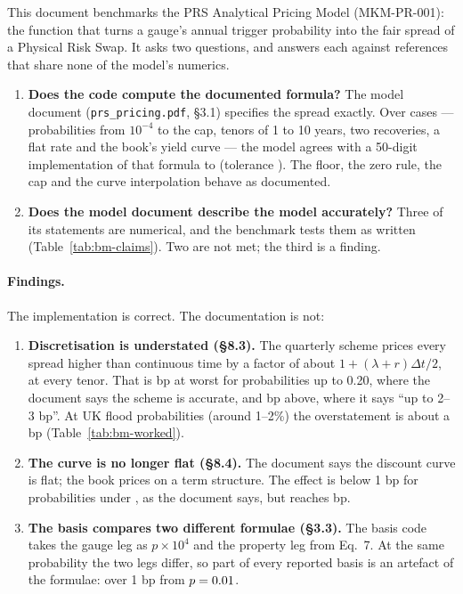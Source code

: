 \documentclass[11pt,a4paper]{article}
\begin{document}
\mkmtitlepage
\mkmlegalpage

\tableofcontents
\clearpage

\mkmexecsummary

This document benchmarks the PRS Analytical Pricing Model (MKM-PR-001): the
function that turns a gauge's annual trigger probability into the fair spread of
a Physical Risk Swap. It asks two questions, and answers each against references
that share none of the model's numerics.

\begin{enumerate}[leftmargin=*]
\item \textbf{Does the code compute the documented formula?} The model document
  (\texttt{prs\_pricing.pdf}, \S3.1) specifies the spread exactly. Over \bmCases{}
  cases --- probabilities from $10^{-4}$ to the cap, tenors of 1 to 10 years, two
  recoveries, a flat rate and the book's yield curve --- the model agrees with a
  50-digit implementation of that formula to \bmWorst{} (tolerance \bmTol).
  \bmWolframConfirms{} The floor, the zero rule, the cap and the curve
  interpolation behave as documented.
\item \textbf{Does the model document describe the model accurately?} Three of its
  statements are numerical, and the benchmark tests them as written
  (Table~\ref{tab:bm-claims}). Two are not met; the third is a finding.
\end{enumerate}

\paragraph{Findings.} The implementation is correct. The documentation is not:
\begin{enumerate}[leftmargin=*]
\item \textbf{Discretisation is understated (\S8.3).} The quarterly scheme prices
  every spread higher than continuous time by a factor of about
  $1+(\lambda+r)\Delta t/2$, at every tenor. That is \bmDiscLow{} bp at worst for
  probabilities up to 0.20, where the document says the scheme is accurate, and
  \bmDiscHigh{} bp above, where it says ``up to 2--3 bp''. At UK flood
  probabilities (around 1--2\%) the overstatement is about a bp
  (Table~\ref{tab:bm-worked}).
\item \textbf{The curve is no longer flat (\S8.4).} The document says the
  discount curve is flat; the book prices on a term structure. The effect is
  below 1 bp for probabilities under \bmCurveOver, as the document says, but
  reaches \bmCurveWorst{} bp.
\item \textbf{The basis compares two different formulae (\S3.3).} The basis code
  takes the gauge leg as $p\times10^4$ and the property leg from Eq.~7. At the
  same probability the two legs differ, so part of every reported basis is an
  artefact of the formulae: over 1 bp from $p=0.01$.
\end{enumerate}
\end{document}
